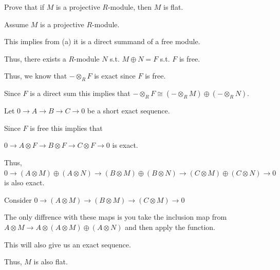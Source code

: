 \documentclass[12pt, letterpaper]{article}
\begin{document}
\begin{subproblem}{}
    Prove that if $M$ is a projective $R$-module, then $M$ is flat.
\end{subproblem}
\begin{problemproof}
    Assume $M$ is a projective $R$-module.

    This implies from (a) it is a direct summand of a free module.

    Thus, there exists a $R$-module $N$ s.t. $M \oplus N = F$ s.t. $F$ is free.

    Thus, we know that $- \otimes_R F$ is exact since $F$ is free.

    Since $F$ is a direct sum this implies that $- \otimes_R F \cong (- \otimes_R M) \oplus (- \otimes_R N)$.

    Let $0 \to A \to B \to C \to 0$ be a short exact sequence.

    Since $F$ is free this implies that

    $0 \to A \otimes F \to B \otimes F \to C \otimes F \to 0$ is exact.

    Thus, $0 \to (A \otimes M) \oplus (A \otimes N) \to (B \otimes M) \oplus (B \otimes N) \to (C \otimes M) \oplus (C \otimes N) \to 0$ is also exact.

    Consider $0 \to (A \otimes M) \to (B \otimes M) \to (C \otimes M) \to 0$

    The only diffrence with these maps is you take the inclusion map from $A \otimes M \to A \otimes (A \otimes M) \oplus (A \otimes N)$ and then apply the function.

    This will also give us an exact sequence.

    Thus, $M$ is also flat.
\end{problemproof}
\end{document}
